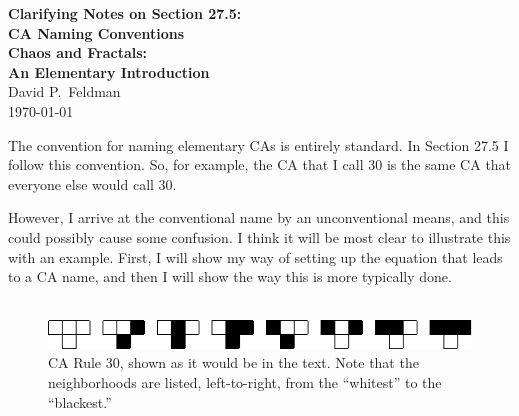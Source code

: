 \documentclass[12pt]{article}
\begin{document}
\pagestyle{empty}

\begin{center}

{\Large {\bf Clarifying Notes on Section 27.5:}}\\
\medskip
{\Large {\bf CA Naming Conventions}}\\
\bigskip
{\large {\bf Chaos and Fractals:}}\\
\medskip
{\bf {\large An Elementary Introduction}}\\
\bigskip
{ {\large David P.~Feldman}}\\
\smallskip
\today
\end{center}


The convention for naming elementary CAs is entirely
standard.   In Section 27.5 I follow this convention.  So, for
example, the CA that I call 30 is the same CA that everyone else
would call 30.  

However, I arrive at the conventional name by an
unconventional means, and this could possibly cause some confusion.
I think it will be most clear to illustrate this with an example.
First, I will show my way of setting up the equation that leads to a
CA name, and then I will show the way this is more typically done.  \\

\\


\begin{figure}[h]
\begin{center}
\includegraphics[width=120mm]{./ca_30_feldman.png}
\caption{CA Rule 30, shown as it would be in the text.  Note that the
  neighborhoods are listed, left-to-right, from the ``whitest'' to the
``blackest.''}
 \label{fig:ca_1}
\vspace{0mm}
\end{center}
\end{figure}
\end{document}
